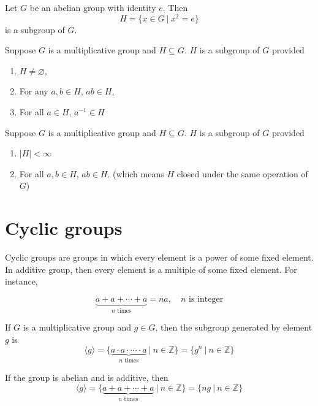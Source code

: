 \begin{example}
    Let $G$ be an abelian group with identity $e$. Then 
    \[
        H = \{ x \in G \> | \> x^2 = e \}
    \]
    is a subgroup of $G$.
\end{example}

\begin{theorem}
    Suppose $G$ is a multiplicative group and $H \subseteq G$. 
    $H$ is a subgroup of $G$ provided 
    \begin{enumerate}
        \item $H \neq \varnothing$,
        \item For any $a, b \in H$, $ab \in H$,
        \item For all $a \in H$, $a^{-1} \in H$
    \end{enumerate}
\end{theorem}

\begin{theorem}
    Suppose $G$ is a multiplicative group and $H \subseteq G$. $H$ is a subgroup of $G$ provided 
    \begin{enumerate}
        \item $|H| < \infty$
        \item For all $a,b\in H$, $ab\in H$. (which means $H$ closed under the same operation of $G$)
    \end{enumerate}
\end{theorem}


\section{Cyclic groups}

Cyclic groups are groups in which every element is a power of some fixed element. In additive group, then every 
element is a multiple of some fixed element. For instance,

\[
    \underbrace{a + a + \cdots + a}_{n \text{ times}} = na, \quad n \text{ is integer}
\]

\begin{definition}
    If $G$ is a multiplicative group and $g \in G$, then the subgroup generated by element $g$ is 
    \begin{equation}
        \langle g \rangle = \{ \underbrace{a \cdot a \cdot \cdots \cdot a}_{n \text{ times}} \> | \> n \in \mathbb{Z} \} = \{ g^n \> | \> n \in \mathbb{Z} \}
    \end{equation}

    If the group is abelian and is additive, then 
    \begin{equation}
        \langle g \rangle = \{ \underbrace{a + a + \cdots + a}_{n \text{ times}} \> | \> n \in \mathbb{Z} \}= \{ ng \> | \> n \in \mathbb{Z} \}
    \end{equation}
\end{definition}

